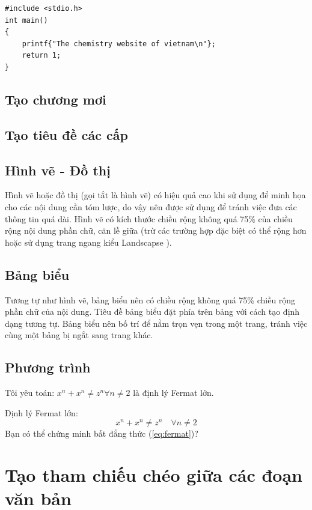 \begin{verbatim}
#include <stdio.h>
int main()
{
    printf{"The chemistry website of vietnam\n"};
    return 1;
}
\end{verbatim}
	
	\subsection{Tạo chương mơi}
	\label{ssec:taochuong}
	
	\subsection{Tạo tiêu đề các cấp}
	\label{ssec:taotieude}
	
	\subsection{Hình vẽ - Đồ thị}
	\label{ssec:hd}
Hình vẽ hoặc đồ thị (gọi tắt là hình vẽ) có hiệu quả cao khi sử dụng để minh họa cho các nội dung cần tóm lược, do vậy nên được sử dụng để tránh việc đưa các thông tin quá dài.
Hình vẽ có kích thước chiều rộng không quá 75\% của chiều rộng nội dung phần chữ, căn lề giữa (trừ các trường hợp đặc biệt có thể rộng hơn hoặc sử dụng trang ngang kiểu Landscapse ).
	

	\subsection{Bảng biểu}
	\label{ssec:bang}
Tương tự như hình vẽ, bảng biểu nên có chiều rộng không quá 75\% chiều rộng phần chữ của nội dung. Tiêu đề bảng biểu đặt phía trên bảng với cách tạo định dạng tương tự. Bảng biểu nên bố trí để nằm trọn vẹn trong một trang, tránh việc cùng một bảng bị ngắt sang trang khác.	
	
	\subsection{Phương trình}
	\label{ssec:pt}
Tôi yêu toán: $x^n + x^n \neq z^n \forall n \neq 2$ là định lý Fermat lớn.\newline

Định lý Fermat lớn:
\begin{equation}
x^n + x^n \neq z^n \quad\forall n \neq 2
\label{eq:fermat}
\end{equation}
Bạn có thể chứng minh bất đẳng thức (\ref{eq:fermat})?
	
	
\section{Tạo tham chiếu chéo giữa các đoạn văn bản}
\label{sec:thamchieucheo}


